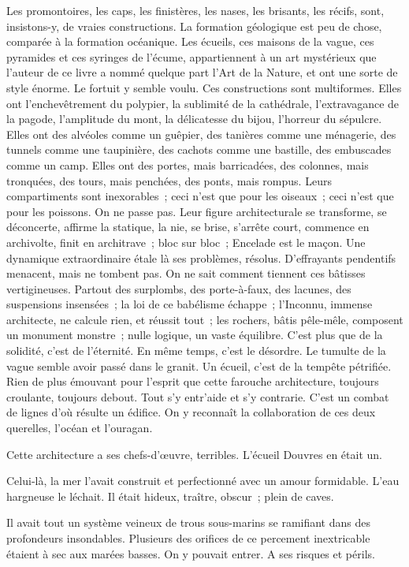 \documentclass[french,twoside]{book} %
\begin{document}
Les promontoires, les caps, les finistères, les nases, les brisants, les récifs, sont, insistons-y, de vraies constructions. La formation géologique est peu de chose, comparée à la formation océanique. Les écueils, ces maisons de la vague, ces pyramides et ces syringes de l’écume, appartiennent à un art mystérieux que l’auteur de ce livre a nommé quelque part l’Art de la Nature, et ont une sorte de style énorme. Le fortuit y semble voulu. Ces constructions sont multiformes. Elles ont l’enchevêtrement du polypier, la sublimité de la cathédrale, l’extravagance de la pagode, l’amplitude du mont, la délicatesse du bijou, l’horreur du sépulcre. Elles ont des alvéoles comme un guêpier, des tanières comme une ménagerie, des tunnels comme une taupinière, des cachots comme une bastille,  des embuscades comme un camp. Elles ont des portes, mais barricadées, des colonnes, mais tronquées, des tours, mais penchées, des ponts, mais rompus. Leurs compartiments sont inexorables ; ceci n’est que pour les oiseaux ; ceci n’est que pour les poissons. On ne passe pas. Leur figure architecturale se transforme, se déconcerte, affirme la statique, la nie, se brise, s’arrête court, commence en archivolte, finit en architrave ; bloc sur bloc ; Encelade est le maçon. Une dynamique extraordinaire étale là ses problèmes, résolus. D’effrayants pendentifs menacent, mais ne tombent pas. On ne sait comment tiennent ces bâtisses vertigineuses. Partout des surplombs, des porte-à-faux, des lacunes, des suspensions insensées ; la loi de ce babélisme échappe ; l’Inconnu, immense architecte, ne calcule rien, et réussit tout ; les rochers, bâtis pêle-mêle, composent un monument monstre ; nulle logique, un vaste équilibre. C’est plus que de la solidité, c’est de l’éternité. En même temps, c’est le désordre. Le tumulte de la vague semble avoir passé dans le granit. Un écueil, c’est de la tempête pétrifiée. Rien de plus émouvant pour l’esprit que cette farouche architecture, toujours croulante, toujours debout. Tout s’y entr’aide et s’y contrarie. C’est un combat de lignes d’où résulte un édifice. On y reconnaît la collaboration de ces deux querelles, l’océan et l’ouragan.\par
Cette architecture a ses chefs-d’œuvre, terribles. L’écueil Douvres en était un.\par
Celui-là, la mer l’avait construit et perfectionné avec un amour formidable. L’eau hargneuse le léchait.  Il était hideux, traître, obscur ; plein de caves.\par
Il avait tout un système veineux de trous sous-marins se ramifiant dans des profondeurs insondables. Plusieurs des orifices de ce percement inextricable étaient à sec aux marées basses. On y pouvait entrer. A ses risques et périls.\par
\end{document}
